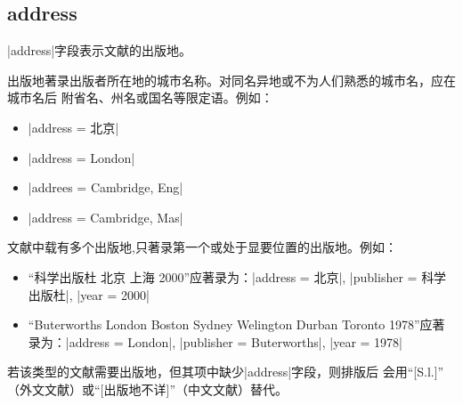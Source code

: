 
\subsection{address}\label{subsec:bibfield-address}

|address|字段表示文献的出版地。

出版地著录出版者所在地的城市名称。对同名异地或不为人们熟悉的城市名，应在城市名后
附省名、州名或国名等限定语。例如：
\begin{itemize}
\item |address = {北京}|
\item |address = {London}|
\item |addrees = {Cambridge, Eng}|
\item |address = {Cambridge, Mas}|
\end{itemize}

文献中载有多个出版地,只著录第一个或处于显要位置的出版地。例如：
\begin{itemize}
\item ``科学出版杜 北京 上海 2000''应著录为：|address = {北京}|, 
  |publisher = {科学出版杜}|, |year = {2000}|
\item ``Buterworths London Boston Sydney Welington Durban Toronto 1978''应著
  录为：|address = {London}|, |publisher = {Buterworths}|, |year = {1978}|
\end{itemize}

若该类型的文献需要出版地，但其{\BibTeX}项中缺少|address|字段，则{\BibTeX}排版后
会用``[S.l.]'' （外文文献）或``[出版地不详]''（中文文献）替代。

